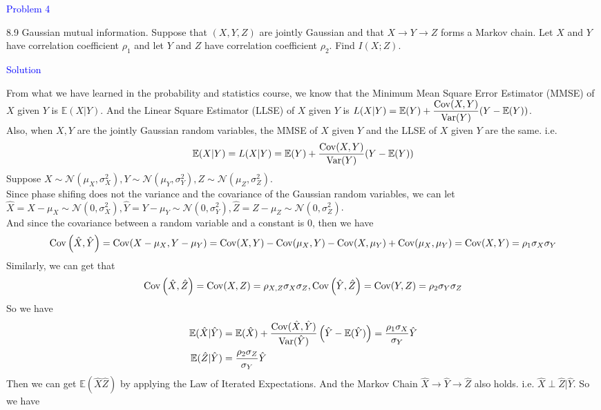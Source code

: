 \textcolor{blue}{Problem 4}

8.9 Gaussian mutual information. Suppose that $(X, Y, Z)$ are jointly Gaussian and that $X \rightarrow Y \rightarrow Z$ forms a Markov chain. Let $X$ and $Y$ have correlation coefficient $\rho_1$ and let $Y$ and $Z$ have correlation coefficient $\rho_2$. Find $I(X ; Z)$.

\textcolor{blue}{Solution}

From what we have learned in the probability and statistics course, we know that the Minimum Mean Square Error Estimator (MMSE) of $X$ given $Y$ is $\mathbb{E}(X|Y)$. And the Linear Square Estimator (LLSE) of $X$ given $Y$ is $L(X|Y)=\mathbb{E}(Y)+\dfrac{\mathrm{Cov}(X,Y)}{\text{Var}(Y)}(Y-\mathbb{E}(Y))$. \\
Also, when $X,Y$ are the jointly Gaussian random variables, the MMSE of $X$ given $Y$ and the LLSE of $X$ given $Y$ are the same. i.e.
$$\mathbb{E}(X|Y)=L(X|Y)=\mathbb{E}(Y)+\dfrac{\mathrm{Cov}(X,Y)}{\text{Var}(Y)}(Y-\mathbb{E}(Y))$$
Suppose $X\sim\mathcal{N}(\mu_X,\sigma_X^2),Y\sim\mathcal{N}(\mu_Y,\sigma_Y^2),Z\sim\mathcal{N}(\mu_Z,\sigma_Z^2)$. \\
Since phase shifing does not the variance and the covariance of the Gaussian random variables, we can let $\hat{X}=X-\mu_X\sim \mathcal{N}(0,\sigma_X^2),\hat{Y}=Y-\mu_Y\sim \mathcal{N}(0,\sigma_Y^2),\hat{Z}=Z-\mu_Z\sim \mathcal{N}(0,\sigma_Z^2)$. \\
And since the covariance between a random variable and a constant is $0$, then we have
$$\mathrm{Cov}\left(\hat{X},\hat{Y}\right)=\mathrm{Cov}(X-\mu_X,Y-\mu_Y)=\mathrm{Cov}(X,Y)-\mathrm{Cov}(\mu_X,Y)-\mathrm{Cov}(X,\mu_Y)+\mathrm{Cov}(\mu_X,\mu_Y)=\mathrm{Cov}(X,Y)=\rho_1\sigma_X\sigma_Y$$
Similarly, we can get that
$$\mathrm{Cov}\left(\hat{X},\hat{Z}\right)=\mathrm{Cov}(X,Z)=\rho_{X,Z}\sigma_X\sigma_Z, \mathrm{Cov}\left(\hat{Y},\hat{Z}\right)=\mathrm{Cov}(Y,Z)=\rho_2\sigma_Y\sigma_Z$$
So we have
\begin{align*}
\mathbb{E}(\hat{X}|\hat{Y}) &= \mathbb{E}(\hat{X})+\dfrac{\mathrm{Cov}(\hat{X},\hat{Y})}{\mathrm{Var}(\hat{Y})}\left(\hat{Y}-\mathbb{E}(\hat{Y})\right) = \dfrac{\rho_1\sigma_X}{\sigma_Y}\hat{Y} \\
\mathbb{E}(\hat{Z}|\hat{Y}) &= \dfrac{\rho_2\sigma_Z}{\sigma_Y}\hat{Y}
\end{align*}
Then we can get $\mathbb{E}\left(\hat{X}\hat{Z}\right)$ by applying the Law of Iterated Expectations. And the Markov Chain $\hat{X}\rightarrow\hat{Y}\rightarrow\hat{Z}$ also holds. i.e. $\hat{X}\perp \hat{Z}|\hat{Y}$. So we have

